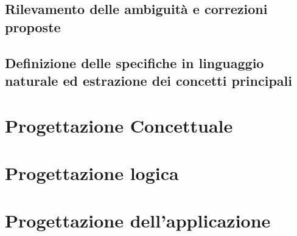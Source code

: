 \documentclass{article}
\begin{document}
\subsection{Rilevamento delle ambiguità e correzioni proposte}

\newpage
\subsection{Definizione delle specifiche in linguaggio naturale ed estrazione dei concetti principali}

\newpage
\section{Progettazione Concettuale}

\newpage
\section{Progettazione logica}

\newpage
\section{Progettazione dell'applicazione}
\end{document}
